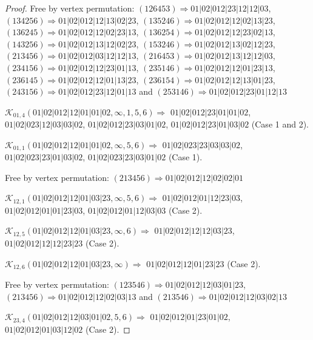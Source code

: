 \documentclass[12pt]{article}
\theoremstyle{plain}
\theoremstyle{definition}
\theoremstyle{remark}
\newcommand{\fancy}[1]{\mathcal{#1}}
\def\K{\fancy{K}}
\begin{document}
\begin{proof}
	
	
	Free by vertex permutation: $(1 2 6 4 5 3)\Rightarrow 01|02|012|23|12|12|03$, $(1 3 4 2 5 6)\Rightarrow 01|02|012|12|13|02|23$, $(1 3 5 2 4 6)\Rightarrow 01|02|012|12|02|13|23$, $(1 3 6 2 4 5)\Rightarrow 01|02|012|12|02|23|13$, $(1 3 6 2 5 4)\Rightarrow 01|02|012|12|23|02|13$, $(1 4 3 2 5 6)\Rightarrow 01|02|012|13|12|02|23$, $(1 5 3 2 4 6)\Rightarrow 01|02|012|13|02|12|23$, $(2 1 3 4 5 6)\Rightarrow 01|02|012|03|12|12|13$, $(2 1 6 4 5 3)\Rightarrow 01|02|012|13|12|12|03$, $(2 3 4 1 5 6)\Rightarrow 01|02|012|12|23|01|13$, $(2 3 5 1 4 6)\Rightarrow 01|02|012|12|01|23|13$, $(2 3 6 1 4 5)\Rightarrow 01|02|012|12|01|13|23$, $(2 3 6 1 5 4)\Rightarrow 01|02|012|12|13|01|23$, $(2 4 3 1 5 6)\Rightarrow 01|02|012|23|12|01|13$ and $(2 5 3 1 4 6)\Rightarrow 01|02|012|23|01|12|13$
	
	
	
	\bigskip
	
	$\K_{01,4}(01|02|012|12|01|01|02,\infty,1, 5, 6)\Rightarrow $ $01|02|012|23|01|01|02$, $01|02|023|12|03|03|02$, $01|02|012|23|03|01|02$, $01|02|012|23|01|03|02$ (Case 1 and 2).
	
	$\K_{01,1}(01|02|012|12|01|01|02,\infty,5, 6)\Rightarrow $ $01|02|023|23|03|03|02$, $01|02|023|23|01|03|02$, $01|02|023|23|03|01|02$ (Case 1).
	
	
	
	Free by vertex permutation: $(2 1 3 4 5 6)\Rightarrow 01|02|012|12|02|02|01$
	
	
	
	\bigskip
	
	$\K_{12,1}(01|02|012|12|01|03|23,\infty,5, 6)\Rightarrow $ $01|02|012|01|12|23|03$, $01|02|012|01|01|23|03$, $01|02|012|01|12|03|03$ (Case 2).
	
	$\K_{12,5}(01|02|012|12|01|03|23,\infty,6)\Rightarrow $ $01|02|012|12|12|03|23$, $01|02|012|12|12|23|23$ (Case 2).
	
	$\K_{12,6}(01|02|012|12|01|03|23,\infty)\Rightarrow $ $01|02|012|12|01|23|23$ (Case 2).
	
	
	
	Free by vertex permutation: $(1 2 3 5 4 6)\Rightarrow 01|02|012|12|03|01|23$, $(2 1 3 4 5 6)\Rightarrow 01|02|012|12|02|03|13$ and $(2 1 3 5 4 6)\Rightarrow 01|02|012|12|03|02|13$
	
	
	
	\bigskip
	
	$\K_{23,4}(01|02|012|12|03|01|02,5, 6)\Rightarrow $ $01|02|012|01|23|01|02$, $01|02|012|01|03|12|02$ (Case 2).
	

\end{proof}
\end{document}
